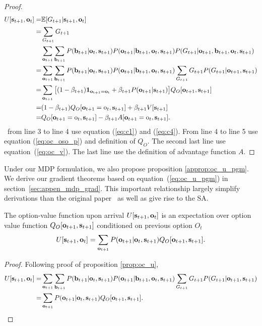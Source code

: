 \begin{proof}
 \begin{align*}
  U[{\mathbf{s}}_{t+1},{\mathbf{o}}_t]=&\mathbb{E}[ G_{t+1}|{\mathbf{s}}_{t+1},{\mathbf{o}}_t ]\\
  =&\sum_{G_{t+1}}G_{t+1}\\
                       &\sum_{{\mathbf{o}}_{t+1}}\sum_{{\mathbf{b}}_{t+1}}P({\mathbf{b}}_{t+1}|{\mathbf{o}}_t,{\mathbf{s}}_{t+1})P({\mathbf{o}}_{t+1}|{\mathbf{b}}_{t+1},{\mathbf{o}}_t,{\mathbf{s}}_{t+1})P(G_{t+1}|{\mathbf{o}}_{t+1},{\mathbf{b}}_{t+1},{\mathbf{o}}_t,{\mathbf{s}}_{t+1})\\
  =&\sum_{{\mathbf{o}}_{t+1}}\sum_{{\mathbf{b}}_{t+1}}P({\mathbf{b}}_{t+1}|{\mathbf{o}}_t,{\mathbf{s}}_{t+1})P({\mathbf{o}}_{t+1}|{\mathbf{b}}_{t+1},{\mathbf{o}}_t,{\mathbf{s}}_{t+1})\sum_{G_{t+1}}G_{t+1}P(G_{t+1}|{\mathbf{o}}_{t+1},{\mathbf{s}}_{t+1})\\
  = &\sum_{{\mathbf{o}}_{t+1}}\big[(1-\beta_{t+1})\bm{1}_\mathrm{{\mathbf{o}}_{t+1}={\mathbf{o}}_t} +\beta_{t+1}P({\mathbf{o}}_{t+1}|{\mathbf{s}}_{t+1})\big]Q_O[{\mathbf{o}}_{t+1},{\mathbf{s}}_{t+1}]\\
  = &(1-\beta_{t+1})Q_O[{\mathbf{o}}_{t+1}={\textnormal{o}}_t,{\mathbf{s}}_{t+1}] +\beta_{t+1}V[{\mathbf{s}}_{t+1}]\\
  = &Q_O[{\mathbf{o}}_{t+1}={\textnormal{o}}_t,{\mathbf{s}}_{t+1}] -\beta_{t+1}A[{\mathbf{o}}_{t+1}={\textnormal{o}}_t,{\mathbf{s}}_{t+1}].
\end{align*}
~from line 3 to line 4 use equation (\ref{eq:c1}) and
(\ref{eq:c4}). From line 4 to line 5 use equation
(\ref{eq:oc_oso_p}) and definition of $Q_O$. The second last line
use equation~(\ref{eq:oc_v}). The last line use the definition of
advantage function $A$.
\end{proof}

Under our MDP formulation, we also propose proposition
\ref{approp:oc_u_pgm}. We derive our gradient theorems based on
equation~(\ref{eq:oc_u_pgm}) in section~\ref{sec:appen_mdp_grad}.
This important relationship largely simplify derivations than the
original paper~\cite{bacon2017option} as well as give rise to the
SA.

\begin{prop}
    \label{approp:oc_u_pgm}
    The option-value function upon arrival $U[{\mathbf{s}}_{t+1},{\mathbf{o}}_t]$
    is an expectation over option value function
    $Q_O[{\mathbf{o}}_{t+1},{\mathbf{s}}_{t+1}]$ conditioned on previous option
    $O_{t}$
  \begin{equation}
    \label{eq:oc_u_pgm}
    U[{\mathbf{s}}_{t+1},{\mathbf{o}}_t]= \sum_{{\mathbf{o}}_{t+1}}P({\mathbf{o}}_{t+1}|{\mathbf{o}}_t,{\mathbf{s}}_{t+1})Q_O[{\mathbf{o}}_{t+1},{\mathbf{s}}_{t+1}].
  \end{equation}
\end{prop}

\begin{proof}
  Following proof of proposition \ref{prop:oc_u},
 \begin{align*}
  \nonumber U[{\mathbf{s}}_{t+1},{\mathbf{o}}_t]=&\sum_{{\mathbf{o}}_{t+1}}\sum_{{\mathbf{b}}_{t+1}}P({\mathbf{b}}_{t+1}|{\mathbf{o}}_t,{\mathbf{s}}_{t+1})P({\mathbf{o}}_{t+1}|{\mathbf{b}}_{t+1},{\mathbf{o}}_t,{\mathbf{s}}_{t+1})\sum_{G_{t+1}}G_{t+1}P(G_{t+1}|{\mathbf{o}}_{t+1},{\mathbf{s}}_{t+1})\\
=&\sum_{{\mathbf{o}}_{t+1}}P({\mathbf{o}}_{t+1}|{\mathbf{o}}_t,{\mathbf{s}}_{t+1})Q_O[{\mathbf{o}}_{t+1},{\mathbf{s}}_{t+1}].
\end{align*}
\end{proof}

